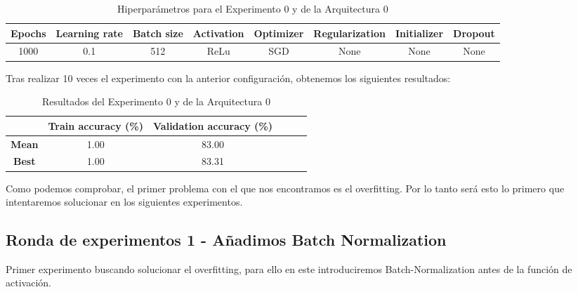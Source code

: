 \documentclass{article}
\begin{document}
			\begin{table}[!h]
				\begin{center}
					\begin{tabular}{| c | c | c | c | c | c | c | c |}
						\textbf{Epochs} & \textbf{Learning rate} & \textbf{Batch size} & \textbf{Activation} & \textbf{Optimizer} & \textbf{Regularization} & \textbf{Initializer} & \textbf{Dropout}\\ \hline
						1000 & 0.1 & 512 & ReLu & SGD & None & None & None
					\end{tabular}
					\caption{Hiperpar\'ametros para el Experimento 0 y de la Arquitectura 0}
					\label{tab:hip-j-a0-e0}
				\end{center}
			\end{table}
			
			Tras realizar 10 veces el experimento con la anterior configuraci\'on, obtenemos los siguientes resultados:
			\begin{table}[!h]
				\begin{center}
					\begin{tabular}{ c | c | c | c | c | c |}
						\ & \textbf{Train accuracy (\%)} & \textbf{Validation accuracy (\%)}  \\ \hline
						\textbf{Mean} & 1.00 & 83.00 \\ \hline
						\textbf{Best} & 1.00 & 83.31 \\ \hline
					\end{tabular}
					\caption{Resultados del Experimento 0 y de la Arquitectura 0}
					\label{tab:res-j-a0-e0}
				\end{center}
			\end{table}
		    
		    Como podemos comprobar, el primer problema con el que nos encontramos es el overfitting. Por lo tanto ser\'a esto lo primero que intentaremos solucionar en los siguientes experimentos.

      \subsection{Ronda de experimentos 1 - A\~{n}adimos Batch Normalization}
		\label{j-s-a0-e1} %
			Primer experimento buscando solucionar el overfitting, para ello en este introduciremos Batch-Normalization antes de la funci\'on de activaci\'on.
			
\end{document}
